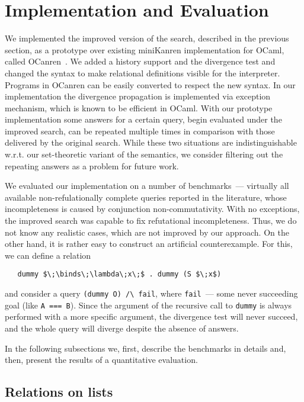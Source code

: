 \section{Implementation and Evaluation}
\label{evaluation}

We implemented the improved version of the search, described in the previous section, 
as a prototype over existing miniKanren implementation for OCaml, called OCanren~\cite{OCanren}. 
We added a history support and the divergence test and changed the syntax to make relational definitions
visible for the interpreter. Programs in OCanren can be easily converted to respect the new syntax.
In our implementation the divergence propagation is implemented via exception mechanism, which is
known to be efficient in OCaml. With our prototype implementation some answers for a certain query, begin
evaluated under the improved search, can be repeated multiple times in comparison with those delivered by the
original search. While these two situations are indistinguishable w.r.t. our set-theoretic variant of the semantics,
we consider filtering out the repeating answers as a problem for future work.

We evaluated our implementation on a number of benchmarks~--- virtually all available non-refulationally
complete queries reported in the literature, whose incompleteness is caused by conjunction non-commutativity.
With no exceptions, the improved search was capable to fix refutational incompleteness. Thus, we do not know any
realistic cases, which are not improved by our approach. On the other hand, it is rather easy to construct
an artificial counterexample. For this, we can define a relation

\begin{lstlisting}
   dummy $\;\binds\;\lambda\;x\;$ . dummy (S $\;x$)
\end{lstlisting}

\noindent and consider a query \lstinline|(dummy O) /\ fail|, where \lstinline|fail|~--- some never
succeeding goal (like \lstinline|A === B|). Since the argument of the recursive call to \lstinline|dummy| is
always performed with a more specific argument, the divergence test will never succeed, and the whole
query will diverge despite the absence of answers. 

In the following subsections we, first, describe the benchmarks in details and, then, present the
results of a quantitative evaluation.

\subsection{Relations on lists}

